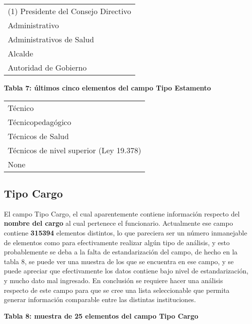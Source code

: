 \documentclass[11pt]{article}
\begin{document}
    
    \begin{tabular}{l}
\toprule
 (1) Presidente del Consejo Directivo \\
                       Administrativo \\
             Administrativos de Salud \\
                              Alcalde \\
                Autoridad de Gobierno \\
\bottomrule
\end{tabular}

    
    \textbf{Tabla 7: últimos cinco elementos del campo Tipo Estamento}

    
    \begin{tabular}{l}
\toprule
                                 Técnico \\
                       Técnicopedagógico \\
                       Técnicos de Salud \\
 Técnicos de nivel superior (Ley 19.378) \\
                                    None \\
\bottomrule
\end{tabular}

    
    \hypertarget{tipo-cargo}{%
\subsection{Tipo Cargo}\label{tipo-cargo}}

    El campo Tipo Cargo, el cual aparentemente contiene información respecto
del \textbf{nombre del cargo} al cual pertenece el funcionario.
Actualmente ese campo contiene \textbf{315394} elementos distintos, lo
que pareciera ser un número inmanejable de elementos como para
efectivamente realizar algún tipo de análisis, y esto probablemente se
deba a la falta de estandarización del campo, de hecho en la tabla 8, se
puede ver una muestra de los que se encuentra en ese campo, y se puede
apreciar que efectivamente los datos contiene bajo nivel de
estandarización, y mucho dato mal ingresado. En conclusión se requiere
hacer una análisis respecto de este campo para que se cree una lista
seleccionable que permita generar información comparable entre las
distintas instituciones.

    \textbf{Tabla 8: muestra de 25 elementos del campo Tipo Cargo}
\end{document}
